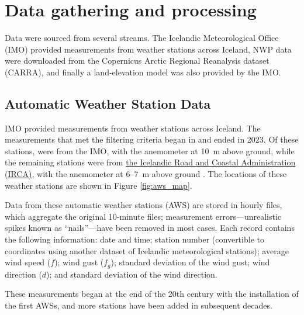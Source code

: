 
\chapter{Data gathering and processing}
\label{Chapter2}
Data were sourced from several streams. The Icelandic Meteorological Office (IMO) provided measurements from weather stations across Iceland, NWP data were downloaded from the Copernicus Arctic Regional Reanalysis dataset (CARRA), and finally a land-elevation model was also provided by the IMO.

\section{Automatic Weather Station Data}

IMO provided measurements from \nStationsMin weather stations across Iceland. The measurements that met the filtering criteria began in \startDateVedur and ended in 2023. Of these \nStationsMin stations, \nVedurMin were from the IMO, with the anemometer at 10~m above ground, while the remaining \nVGMin stations were from \href{https://www.vegagerdin.is/}{the Icelandic Road and Coastal Administration (IRCA)}, with the anemometer at 6–7~m above ground \cite{vegagerdin_postur}. The locations of these weather stations are shown in Figure \ref{fig:aws_map}.

Data from these automatic weather stations (AWS) are stored in hourly files, which aggregate the original 10-minute files; measurement errors—unrealistic spikes known as “nails”—have been removed in most cases. Each record contains the following information: date and time; station number (convertible to coordinates using another dataset of Icelandic meteorological stations); average wind speed ($f$); wind gust ($f_g$); standard deviation of the wind gust; wind direction ($d$); and standard deviation of the wind direction.

These measurements began at the end of the 20th century with the installation of the first AWSs, and more stations have been added in subsequent decades.

